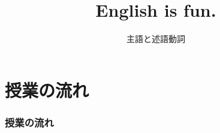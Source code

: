 \documentclass[aspectratio=169,xcolor={dvipsnames,table}]{beamer}
\title{English is fun.}
\subtitle{主語と述語動詞}
\author{}
\institute[]{}
\date[]
\begin{document}
%
%
%
%
%
%
\begin{frame}[plain,label=title]
  \titlepage
\end{frame}
%
%
%
%
%
%
%
\section*{授業の流れ}
\begin{frame}[plain]
  \frametitle{授業の流れ}
  \tableofcontents
\end{frame}
\end{document}
